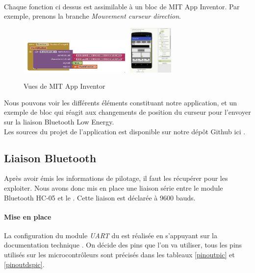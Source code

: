 		\\Chaque fonction ci dessus est assimilable à un bloc de MIT App Inventor. Par exemple, prenons la branche \textit{Mouvement curseur direction}.
		\begin{figure}
			\begin{center}		
				\includegraphics[width=0.5\textwidth]{../Illus/MITBlock.png}
				\includegraphics[width=0.2\textwidth]{../Illus/MITScreen.png}
			\end{center}
			\caption{Vues de MIT App Inventor}
		\end{figure}
		Nous pouvons voir les différents éléments constituant notre application, et un exemple de bloc qui réagit aux changements de position du curseur pour l'envoyer sur la liaison Bluetooth Low Energy.
		\\Les sources du projet de l'application est disponible sur notre dépôt Github ici \cite{git}.
			\subsection{Liaison Bluetooth}
			Après avoir émis les informations de pilotage, il faut les récupérer pour les exploiter. Nous avons donc mis en place une liaison série entre le module Bluetooth HC-05 et le \pic. Cette liaison est déclarée à 9600 bauds.
			\paragraph{Mise en place}La configuration du module \textit{UART} du \pic est réalisée en s'appuyant sur la documentation technique \cite{DatasheetPIC}. On décide des pins que l'on va utiliser, tous les pins utilisés sur les microcontrôleurs sont précisés dans les tableaux \ref{pinoutpic} et \ref{pinoutdspic}.
			
			
